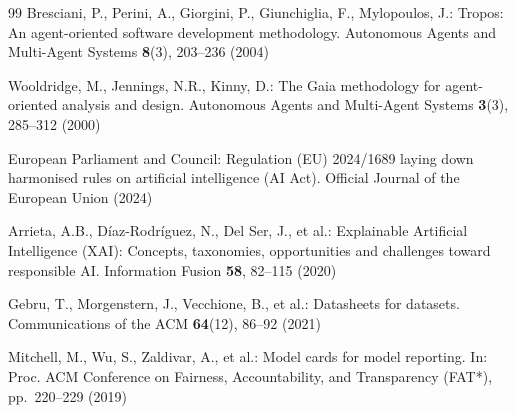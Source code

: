 \documentclass[runningheads]{llncs}
\begin{document}
\begin{thebibliography}{99}
Bresciani, P., Perini, A., Giorgini, P., Giunchiglia, F., Mylopoulos, J.:
Tropos: An agent-oriented software development methodology.
Autonomous Agents and Multi-Agent Systems \textbf{8}(3), 203--236 (2004)

Wooldridge, M., Jennings, N.R., Kinny, D.:
The Gaia methodology for agent-oriented analysis and design.
Autonomous Agents and Multi-Agent Systems \textbf{3}(3), 285--312 (2000)

European Parliament and Council:
Regulation (EU) 2024/1689 laying down harmonised rules on artificial intelligence (AI Act).
Official Journal of the European Union (2024)

Arrieta, A.B., D{\'i}az-Rodr{\'i}guez, N., Del Ser, J., et al.:
Explainable Artificial Intelligence (XAI): Concepts, taxonomies, opportunities and challenges toward responsible AI.
Information Fusion \textbf{58}, 82--115 (2020)

Gebru, T., Morgenstern, J., Vecchione, B., et al.:
Datasheets for datasets.
Communications of the ACM \textbf{64}(12), 86--92 (2021)

Mitchell, M., Wu, S., Zaldivar, A., et al.:
Model cards for model reporting.
In: Proc. ACM Conference on Fairness, Accountability, and Transparency (FAT*), pp.~220--229 (2019)

\end{thebibliography}
\end{document}
